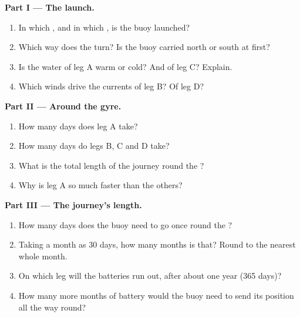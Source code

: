 \begin{problem}
\noindent\textbf{Part I --- The launch.}\par\nopagebreak
\begin{enumerate}[beginpenalty=10000]
  \item In which , and in which , is the buoy launched?
  \item Which way does the  turn? Is the buoy carried north or south
        at first?
  \item Is the water of leg A warm or cold? And of leg C? Explain.
  \item Which winds drive the currents of leg B? Of leg D?
\end{enumerate}

\noindent\textbf{Part II --- Around the gyre.}\par\nopagebreak
\begin{enumerate}[resume, beginpenalty=10000]
  \item How many days does leg A take?
  \item How many days do legs B, C and D take?
  \item What is the total length of the journey round the ?
  \item Why is leg A so much faster than the others?
\end{enumerate}

\noindent\textbf{Part III --- The journey's length.}\par\nopagebreak
\begin{enumerate}[resume, beginpenalty=10000]
  \item How many days does the buoy need to go once round the ?
  \item Taking a month as 30 days, how many months is that? Round to the
        nearest whole month.
  \item On which leg will the batteries run out, after about one year
        (365 days)?
  \item How many more months of battery would the buoy need to send its
        position all the way round?
\end{enumerate}
\end{problem}
